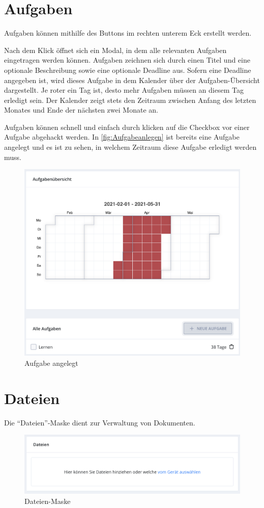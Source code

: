 \section{Aufgaben}\label{sec:Aufgaben}
Aufgaben können mithilfe des Buttons im rechten unterem Eck erstellt werden.

Nach dem Klick öffnet sich ein Modal, in dem alle relevanten Aufgaben eingetragen werden können.
Aufgaben zeichnen sich durch einen Titel und eine optionale Beschreibung sowie eine optionale Deadline aus.
Sofern eine Deadline angegeben ist, wird dieses Aufgabe in dem Kalender über der Aufgaben-Übersicht dargestellt.
Je roter ein Tag ist, desto mehr Aufgaben müssen an diesem Tag erledigt sein.
Der Kalender zeigt stets den Zeitraum zwischen Anfang des letzten Monates und Ende der nächsten zwei Monate  an.

Aufgaben können schnell und einfach durch klicken auf die Checkbox vor einer Aufgabe abgehackt werden.
In \autoref{fig:Aufgabeanlegen} ist bereits eine Aufgabe angelegt und es ist zu sehen, in welchem Zeitraum diese Aufgabe erledigt werden muss.
\begin{figure}[h]
    \centering
    \includegraphics[width=.7\textwidth]{img/Aufgabe_angelegt.png}
    \caption{Aufgabe angelegt}
    \label{fig:Aufgabeanlegen}
\end{figure}




\section{Dateien}
Die \enquote{Dateien}-Maske dient zur Verwaltung von Dokumenten.

\begin{figure}[h] 
    \centering
    \includegraphics[width=.7\textwidth]{img/Dateien_uebersicht.png}
    \caption{Dateien-Maske}
    \label{fig:dateien}
\end{figure}

